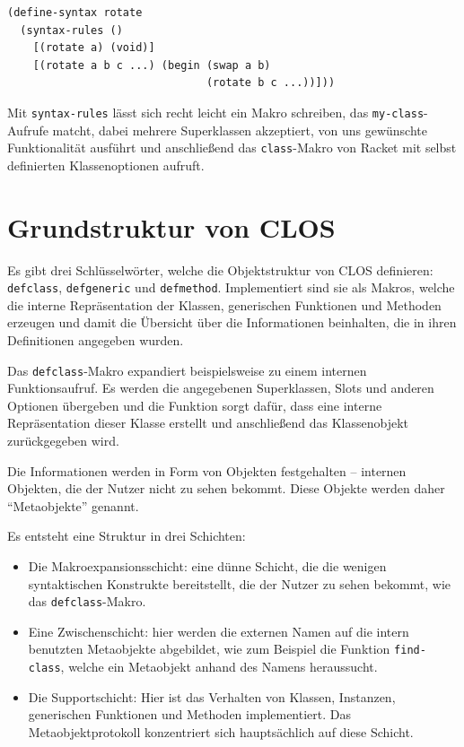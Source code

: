 \begin{lstlisting}
(define-syntax rotate
  (syntax-rules ()
    [(rotate a) (void)]
    [(rotate a b c ...) (begin (swap a b)
                               (rotate b c ...))]))
\end{lstlisting}

Mit \texttt{syntax-rules} lässt sich recht leicht ein Makro schreiben, das  \texttt{my-class}-Aufrufe matcht, dabei mehrere Superklassen akzeptiert, von uns gewünschte Funktionalität ausführt und anschließend das \texttt{class}-Makro von Racket mit selbst definierten Klassenoptionen aufruft.


\section{Grundstruktur von CLOS}
Es gibt drei Schlüsselwörter, welche die Objektstruktur von CLOS definieren:  \texttt{defclass}, \texttt{defgeneric} und \texttt{defmethod}. Implementiert sind sie als Makros, welche die interne Repräsentation der Klassen, generischen Funktionen und Methoden erzeugen und damit die Übersicht über die Informationen beinhalten, die in ihren Definitionen angegeben wurden.

Das \texttt{defclass}-Makro expandiert beispielsweise zu einem internen Funktionsaufruf. Es werden die angegebenen Superklassen, Slots und anderen Optionen übergeben und die Funktion sorgt dafür, dass eine interne Repräsentation dieser Klasse erstellt und anschließend das Klassenobjekt zurückgegeben wird.

Die Informationen werden in Form von Objekten festgehalten -- internen Objekten, die der Nutzer nicht zu sehen bekommt. Diese Objekte werden daher ``Metaobjekte'' genannt.

Es entsteht eine Struktur in drei Schichten:
\begin{itemize}
 \item Die Makroexpansionsschicht: eine dünne Schicht, die die wenigen syntaktischen Konstrukte bereitstellt, die der Nutzer zu sehen bekommt, wie das \texttt{defclass}-Makro.
 \item Eine Zwischenschicht: hier werden die externen Namen auf die intern benutzten Metaobjekte abgebildet, wie zum Beispiel die Funktion \texttt{find-class}, welche ein Metaobjekt anhand des Namens heraussucht.
 \item Die Supportschicht: Hier ist das Verhalten von Klassen, Instanzen, generischen Funktionen und Methoden implementiert. Das Metaobjektprotokoll konzentriert sich hauptsächlich auf diese Schicht.
\end{itemize}

